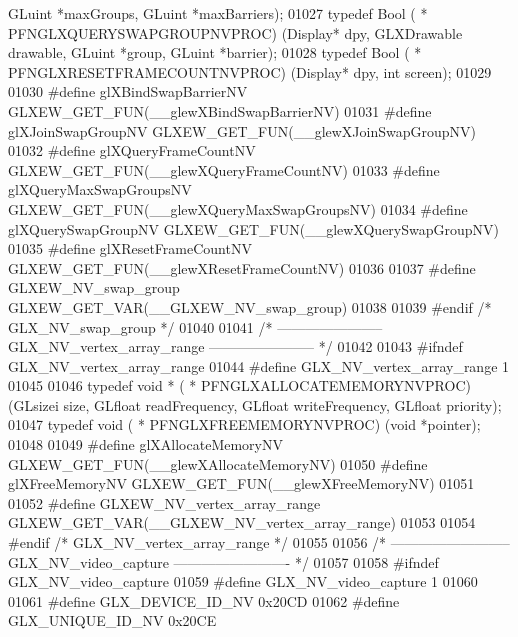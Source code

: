 \begin{DoxyCode}
      GLuint *maxGroups, GLuint *maxBarriers);
01027 \textcolor{keyword}{typedef} Bool ( * PFNGLXQUERYSWAPGROUPNVPROC) (Display* dpy, GLXDrawable drawable, 
      GLuint *group, GLuint *barrier);
01028 \textcolor{keyword}{typedef} Bool ( * PFNGLXRESETFRAMECOUNTNVPROC) (Display* dpy, \textcolor{keywordtype}{int} screen);
01029 
01030 \textcolor{preprocessor}{#define glXBindSwapBarrierNV GLXEW\_GET\_FUN(\_\_glewXBindSwapBarrierNV)}
01031 \textcolor{preprocessor}{#define glXJoinSwapGroupNV GLXEW\_GET\_FUN(\_\_glewXJoinSwapGroupNV)}
01032 \textcolor{preprocessor}{#define glXQueryFrameCountNV GLXEW\_GET\_FUN(\_\_glewXQueryFrameCountNV)}
01033 \textcolor{preprocessor}{#define glXQueryMaxSwapGroupsNV GLXEW\_GET\_FUN(\_\_glewXQueryMaxSwapGroupsNV)}
01034 \textcolor{preprocessor}{#define glXQuerySwapGroupNV GLXEW\_GET\_FUN(\_\_glewXQuerySwapGroupNV)}
01035 \textcolor{preprocessor}{#define glXResetFrameCountNV GLXEW\_GET\_FUN(\_\_glewXResetFrameCountNV)}
01036 
01037 \textcolor{preprocessor}{#define GLXEW\_NV\_swap\_group GLXEW\_GET\_VAR(\_\_GLXEW\_NV\_swap\_group)}
01038 
01039 \textcolor{preprocessor}{#endif }\textcolor{comment}{/* GLX\_NV\_swap\_group */}\textcolor{preprocessor}{}
01040 
01041 \textcolor{comment}{/* ----------------------- GLX\_NV\_vertex\_array\_range ----------------------- */}
01042 
01043 \textcolor{preprocessor}{#ifndef GLX\_NV\_vertex\_array\_range}
01044 \textcolor{preprocessor}{#define GLX\_NV\_vertex\_array\_range 1}
01045 
01046 \textcolor{keyword}{typedef} \textcolor{keywordtype}{void} * ( * PFNGLXALLOCATEMEMORYNVPROC) (GLsizei size, GLfloat readFrequency, 
      GLfloat writeFrequency, GLfloat priority);
01047 \textcolor{keyword}{typedef} void ( * PFNGLXFREEMEMORYNVPROC) (\textcolor{keywordtype}{void} *pointer);
01048 
01049 \textcolor{preprocessor}{#define glXAllocateMemoryNV GLXEW\_GET\_FUN(\_\_glewXAllocateMemoryNV)}
01050 \textcolor{preprocessor}{#define glXFreeMemoryNV GLXEW\_GET\_FUN(\_\_glewXFreeMemoryNV)}
01051 
01052 \textcolor{preprocessor}{#define GLXEW\_NV\_vertex\_array\_range GLXEW\_GET\_VAR(\_\_GLXEW\_NV\_vertex\_array\_range)}
01053 
01054 \textcolor{preprocessor}{#endif }\textcolor{comment}{/* GLX\_NV\_vertex\_array\_range */}\textcolor{preprocessor}{}
01055 
01056 \textcolor{comment}{/* -------------------------- GLX\_NV\_video\_capture ------------------------- */}
01057 
01058 \textcolor{preprocessor}{#ifndef GLX\_NV\_video\_capture}
01059 \textcolor{preprocessor}{#define GLX\_NV\_video\_capture 1}
01060 
01061 \textcolor{preprocessor}{#define GLX\_DEVICE\_ID\_NV 0x20CD}
01062 \textcolor{preprocessor}{#define GLX\_UNIQUE\_ID\_NV 0x20CE}

\end{DoxyCode}
